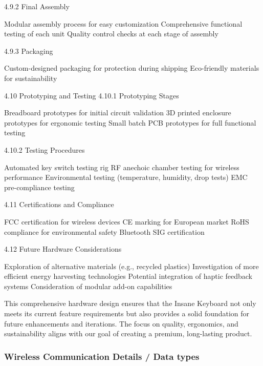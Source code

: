\documentclass[a4paper,11pt]{article}%
\begin{document}
4.9.2 Final Assembly

Modular assembly process for easy customization
Comprehensive functional testing of each unit
Quality control checks at each stage of assembly

4.9.3 Packaging

Custom-designed packaging for protection during shipping
Eco-friendly materials for sustainability

4.10 Prototyping and Testing
4.10.1 Prototyping Stages

Breadboard prototypes for initial circuit validation
3D printed enclosure prototypes for ergonomic testing
Small batch PCB prototypes for full functional testing

4.10.2 Testing Procedures

Automated key switch testing rig
RF anechoic chamber testing for wireless performance
Environmental testing (temperature, humidity, drop tests)
EMC pre-compliance testing

4.11 Certifications and Compliance

FCC certification for wireless devices
CE marking for European market
RoHS compliance for environmental safety
Bluetooth SIG certification

4.12 Future Hardware Considerations

Exploration of alternative materials (e.g., recycled plastics)
Investigation of more efficient energy harvesting technologies
Potential integration of haptic feedback systems
Consideration of modular add-on capabilities

This comprehensive hardware design ensures that the Insane Keyboard not only meets its current feature requirements but also provides a solid foundation for future enhancements and iterations. The focus on quality, ergonomics, and sustainability aligns with our goal of creating a premium, long-lasting product.

\subsubsection{Wireless Communication Details / Data types}
\end{document}
